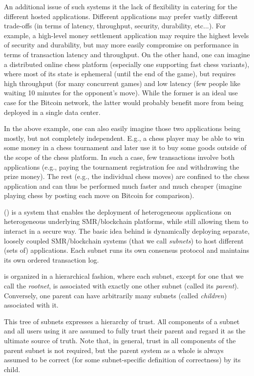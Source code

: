 An additional issue of such systems it the lack of flexibility in catering for the different hosted applications.
Different applications may prefer vastly different trade-offs (in terms of latency, throughput, security, durability, etc...).
For example, a high-level money settlement application may require the highest levels of security and durability, but may more easily compromise on performance in terms of transaction latency and throughput.
On the other hand, one can imagine a distributed online chess platform (especially one supporting fast chess variants), where most of its state is ephemeral (until the end of the game), but requires high throughput (for many concurrent games) and low latency (few people like waiting 10 minutes for the opponent's move).
While the former is an ideal use case for the Bitcoin network, the latter would probably benefit more from being deployed in a single data center.

In the above example, one can also easily imagine those two applications being mostly, but not completely independent.
E.g., a chess player may be able to win some money in a chess tournament and later use it to buy some goods outside of the scope of the chess platform.
In such a case, few transactions involve both applications (e.g., paying the tournament registration fee and withdrawing the prize money).
The rest (e.g., the individual chess moves) are confined to the chess application and can thus be performed much faster and much cheaper (imagine playing chess by posting each move on Bitcoin for comparison).

\ipcFull (\ipc) is a system that enables the deployment of heterogeneous applications on heterogeneous underlying SMR/blockchain platforms, while still allowing them to interact in a secure way.
The basic idea behind \ipc is dynamically deploying separate, loosely coupled SMR/blockchain systems (that we call \emph{subnets}) to host different (sets of) applications.
Each subnet runs its own consensus protocol and maintains its own ordered transaction log.

\ipc is organized in a hierarchical fashion, where each subnet, except for one that we call the \emph{rootnet}, is associated with exactly one other subnet (called its \emph{parent}).
Conversely, one parent can have arbitrarily many subnets (called \emph{children}) associated with it.

This tree of subnets expresses a hierarchy of trust.
All components of a subnet and all users using it are assumed to fully trust their parent and regard it as the ultimate source of truth.
Note that, in general, trust in all components of the parent subnet is not required, but the parent system as a whole is always assumed to be correct (for some subnet-specific definition of correctness) by its child.

